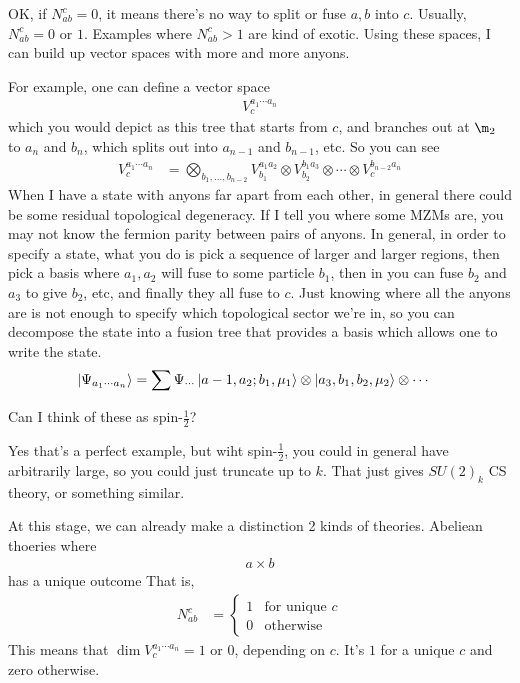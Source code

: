 OK, if $N_{ab}^c=0$,
it means there's no way to split or fuse $a,b$ into $c$.
Usually,
$N_{ab}^{c}=0$ or $1$.
Examples where $N_{ab}^{c}>1$ are kind of exotic.
Using these spaces,
I can build up vector spaces with more and more anyons.

For example,
one can define a vector space
\begin{align}
    V_{c}^{a_1 \cdots a_n}
\end{align}
which you would depict as this tree that starts from $c$,
and branches out at $\m_2$ to $a_n$
and $b_n$,
which splits out into $a_{n-1}$ and $b_{n-1}$, etc.
So you can see
\begin{align}
    V_{c}^{a_1 \cdots a_n}
    &=
    \bigotimes_{b_1,\ldots,b_{n-2}}
    V_{b_1}^{a_1 a_2}
    \otimes
    V_{b_2}^{b_1 a_3}
    \otimes \cdots \otimes
    V_{c}^{b_{n-2} a_n}
\end{align}
When I have a state with anyons far apart from each other,
in general there could be  some residual topological degeneracy.
If I tell you where some MZMs are,
you may not know the fermion parity between pairs of anyons.
In general,
in order to specify a state,
what you do is pick a sequence of larger and larger regions,
then pick a basis where $a_1,a_2$ will fuse to some particle $b_1$,
then in you can fuse $b_2$ and $a_3$ to give $b_2$, etc,
and finally they all fuse to $c$.
Just knowing where all the anyons are is not enough to specify which topological
sector we're in,
so you can decompose the state into a fusion tree that provides a basis which
allows one to write the state.
\begin{align}
    \ket{\Psi_{a_1\cdots a_n}}
    &=
    \sum \Psi_{\cdots}
    \ket{a-1,a_2;b_1,\mu_1}
    \otimes
    \ket{a_3,b_1,b_2,\mu_2}
    \otimes
    \cdots
\end{align}

\begin{question}
    Can I think of these as spin-$\frac{1}{2}$?
\end{question}
Yes that's a perfect example,
but wiht spin-$\frac{1}{2}$,
you could in general have arbitrarily large,
so you could just truncate up to $k$.
That just gives $SU(2)_k$ CS theory,
or something similar.

At this stage,
we can already make a distinction 2 kinds of theories.
Abeliean thoeries where
\begin{align}
    a\times b
\end{align}
has a unique outcome
That is,
\begin{align}
    N_{ab}^c &=
    \begin{cases}
        1 &\text{for unique }c\\
        0 &\text{otherwise}
    \end{cases}
\end{align}
This means that $\dim V_c^{a_1\cdots a_n}=1$ or $0$,
depending on $c$.
It's $1$ for a unique $c$ and zero otherwise.


